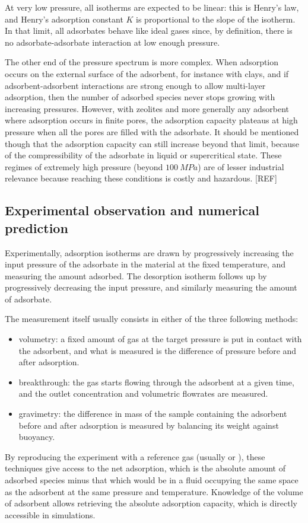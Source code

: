 \documentclass[main.tex]{subfiles}
\begin{document}
At very low pressure, all isotherms are expected to be linear: this is Henry's law, and Henry's adsorption constant $K$ is proportional to the slope of the isotherm. In that limit, all adsorbates behave like ideal gases since, by definition, there is no adsorbate-adsorbate interaction at low enough pressure.

The other end of the pressure spectrum is more complex. When adsorption occurs on the external surface of the adsorbent, for instance with clays, and if adsorbent-adsorbent interactions are strong enough to allow multi-layer adsorption, then the number of adsorbed species never stops growing with increasing pressures. However, with zeolites and more generally any adsorbent where adsorption occurs in finite pores, the adsorption capacity plateaus at high pressure when all the pores are filled with the adsorbate. It should be mentioned though that the adsorption capacity can still increase beyond that limit, because of the compressibility of the adsorbate in liquid or supercritical state. These regimes of extremely high pressure (beyond $\qty{100}{MPa}$) are of lesser industrial relevance because reaching these conditions is costly and hazardous. [REF]

\subsection{Experimental observation and numerical prediction}

Experimentally, adsorption isotherms are drawn by progressively increasing the input pressure of the adsorbate in the material at the fixed temperature, and measuring the amount adsorbed. The desorption isotherm follows up by progressively decreasing the input pressure, and similarly measuring the amount of adsorbate.

The measurement itself usually consists in either of the three following methods:
\begin{itemize}
	\item volumetry: a fixed amount of gas at the target pressure is put in contact with the adsorbent, and what is measured is the difference of pressure before and after adsorption.
	\item breakthrough: the gas starts flowing through the adsorbent at a given time, and the outlet concentration and volumetric flowrates are measured.
	\item gravimetry: the difference in mass of the sample containing the adsorbent before and after adsorption is measured by balancing its weight against buoyancy.
\end{itemize}
By reproducing the experiment with a reference gas (usually  or ), these techniques give access to the net adsorption, which is the absolute amount of adsorbed species minus that which would be in a fluid occupying the same space as the adsorbent at the same pressure and temperature. Knowledge of the volume of adsorbent allows retrieving the absolute adsorption capacity, which is directly accessible in simulations.
\end{document}
